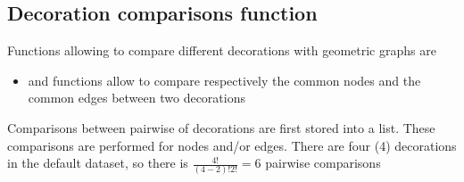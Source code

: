 \documentclass[article]{jss}\usepackage{knitr}
\begin{document}
\subsection{Decoration comparisons function} \label{sec:functions_one}

Functions allowing to compare different decorations with geometric graphs are

\begin{itemize}
\setlength\itemsep{.1em}
  \item {} and  functions allow to compare respectively the common nodes and the common edges between two decorations
\end{itemize}

Comparisons between pairwise of decorations are first stored into a list. These comparisons are performed for nodes and/or edges. There are four (4) decorations in the default dataset, so there is $\frac{4!}{(4-2)!2!}={6}$ pairwise comparisons
\end{document}

